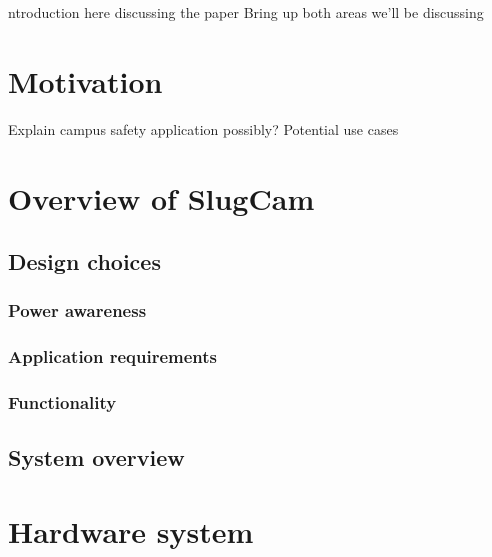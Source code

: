 \documentclass[journal,transmag]{IEEEtran}
\begin{document}
 ntroduction here discussing the paper
 Bring up both areas we'll be discussing






\section{Motivation}

Explain campus safety application possibly? Potential use cases







\section{Overview of SlugCam}

	\subsection{Design choices}

		\subsubsection{Power awareness}

		\subsubsection{Application requirements}

		\subsubsection{Functionality}

	\subsection{System overview}






\section{Hardware system}
\end{document}
